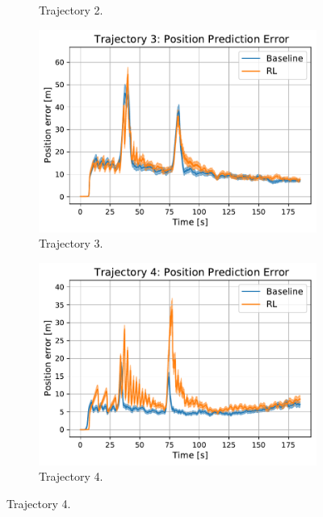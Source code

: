 \documentclass[english, 12pt, a4paper, elec, utf8, a-1b, online]{aaltothesis}
\numberwithin{equation}{section}
\begin{document}
\begin{figure}
\begin{subfigure}[b]{0.45\textwidth}
        \caption{Trajectory 2.}
        \label{fig:PE_T2}
    \end{subfigure}
    \hfill
    \begin{subfigure}[b]{0.45\textwidth}
        \centering
        \includegraphics[width=\linewidth]{figures/benchmark/Simulations/mean_position_error2.pdf}
        \caption{Trajectory 3.}
        \label{fig:PE_T3}
    \end{subfigure}
    \hfill
    \begin{subfigure}[b]{0.45\textwidth}
        \centering
        \includegraphics[width=\linewidth]{figures/benchmark/Simulations/mean_position_error3.pdf}
        \caption{Trajectory 4.}
        \label{fig:PE_T4}
    \end{subfigure}
    \hfill

\end{figure}
\end{document}
